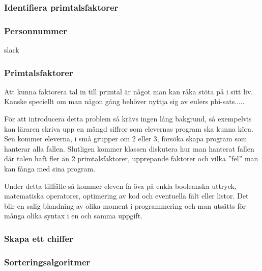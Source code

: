 \subsubsection{Identifiera primtalsfaktorer}
    \label{sec:primtal}

\subsubsection{Personnummer}
    \label{sec:Pnr}
    
    \textcolor{WildStrawberry}{
        slack}
        
\subsubsection{Primtalsfaktorer}
    \label{sec:Primtal}
    
    \textcolor{WildStrawberry}{
        Att kunna faktorera tal in till primtal är något man kan råka stöta på i sitt liv. Kanske speciellt om man någon gång behöver nyttja sig av eulers phi-sats.....  }
        
    \textcolor{WildStrawberry}{
        För att introducera detta problem så krävs ingen lång bakgrund, så exempelvis kan läraren skriva upp en mängd siffror som elevernas program ska kunna köra. Sen kommer eleverna, i små grupper om 2 eller 3, försöka skapa program som hanterar alla fallen. Slutligen kommer klassen diskutera hur man hanterat fallen där talen haft fler än 2 primtalsfaktorer, upprepande faktorer och vilka ''fel'' man kan fånga med sina program. }
        
    \textcolor{WildStrawberry}{
        Under detta tillfälle så kommer eleven få öva på enkla booleanska uttryck, matematiska operatorer, optimering av kod och eventuella fält eller listor. Det blir en salig blandning av olika moment i programmering och man utsätts för många olika syntax i en och samma uppgift.}

\subsubsection{Skapa ett chiffer}
    \label{sec:chiffer}
    
\subsubsection{Sorteringsalgoritmer}
    \label{sec:sorteringsalgoritmer}